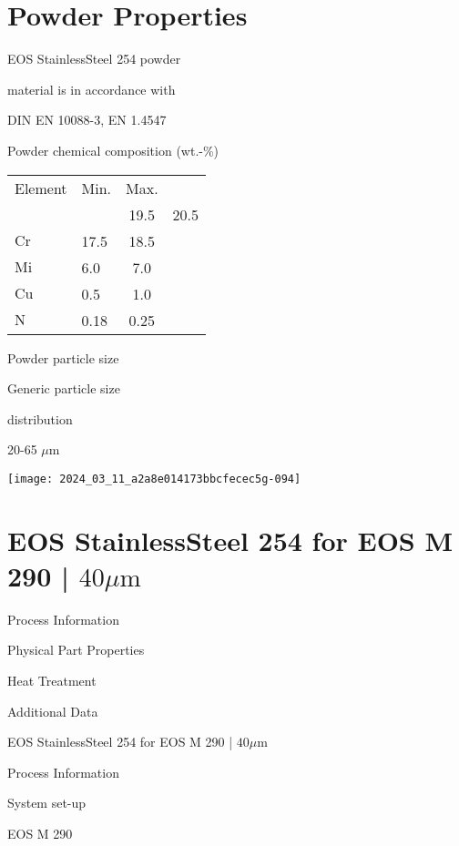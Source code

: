 \documentclass[10pt]{article}
\begin{document}
\section*{Powder Properties}
EOS StainlessSteel 254 powder

material is in accordance with

DIN EN 10088-3, EN 1.4547

Powder chemical composition (wt.-\%)

\begin{center}
\begin{tabular}{llcc}
\hline
Element & Min. & Max. &  \\
\cline { 1 - 1 }
 &  & 19.5 & 20.5 \\
\hline
$\mathrm{Cr}$ & 17.5 & 18.5 &  \\
\hline
$\mathrm{Mi}$ & 6.0 & 7.0 &  \\
\hline
$\mathrm{Cu}$ & 0.5 & 1.0 &  \\
\hline
$\mathrm{N}$ & 0.18 & 0.25 &  \\
\hline
\end{tabular}
\end{center}

Powder particle size

Generic particle size

distribution

20-65 $\mu \mathrm{m}$

\begin{center}
\texttt{[image: 2024\_03\_11\_a2a8e014173bbcfecec5g-094]}
\end{center}

\section*{EOS StainlessSteel 254 for EOS M 290 | $40 \mu \mathrm{m}$}
Process Information

Physical Part Properties

Heat Treatment

Additional Data

EOS StainlessSteel 254 for EOS M 290 | $40 \mu \mathrm{m}$

Process Information

System set-up

EOS M 290
\end{document}
